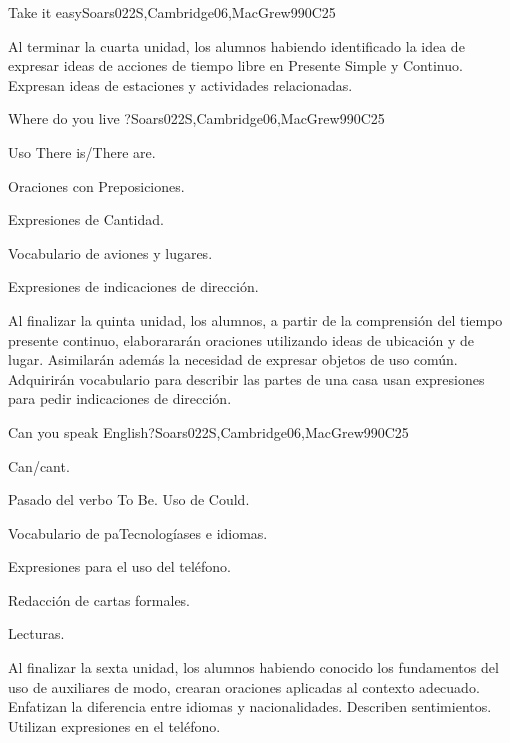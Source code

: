 \begin{syllabus}
\begin{unit}{Take it easy}{}{Soars022S,Cambridge06,MacGrew99}{0}{C25}
   \begin{learningoutcomes}
      \item Al terminar la cuarta unidad, los alumnos habiendo identificado la idea de expresar ideas de acciones de tiempo libre en Presente Simple y Continuo. Expresan ideas de estaciones y actividades relacionadas.
   \end{learningoutcomes}

\end{unit}

\begin{unit}{Where do you live ?}{}{Soars022S,Cambridge06,MacGrew99}{0}{C25}
   \begin{topics}
      \item Uso There is/There are.
      \item Oraciones con Preposiciones.
      \item Expresiones de Cantidad.
      \item Vocabulario de aviones y lugares.
      \item Expresiones de indicaciones de dirección.
   \end{topics}

   \begin{learningoutcomes}
      \item Al finalizar la quinta unidad, los alumnos, a partir de la comprensión del tiempo presente continuo, elaborararán oraciones utilizando ideas de ubicación y de lugar. Asimilarán además la necesidad de expresar objetos de uso común. Adquirirán vocabulario para describir las partes de una casa usan expresiones para pedir indicaciones de dirección.
   \end{learningoutcomes}
\end{unit}

\begin{unit}{Can you speak English?}{}{Soars022S,Cambridge06,MacGrew99}{0}{C25}
   \begin{topics}
      \item Can/cant.
      \item Pasado del verbo To Be. Uso de Could.
      \item Vocabulario de paTecnologíases e idiomas.
      \item Expresiones para el uso del teléfono.
      \item Redacción de cartas formales.
      \item Lecturas.
   \end{topics}

   \begin{learningoutcomes}
      \item Al finalizar la sexta unidad, los alumnos habiendo conocido los fundamentos del uso de auxiliares de modo, crearan oraciones aplicadas al contexto adecuado. Enfatizan la diferencia entre idiomas y nacionalidades. Describen sentimientos. Utilizan expresiones en el teléfono.
   \end{learningoutcomes}
\end{unit}


\end{syllabus}
